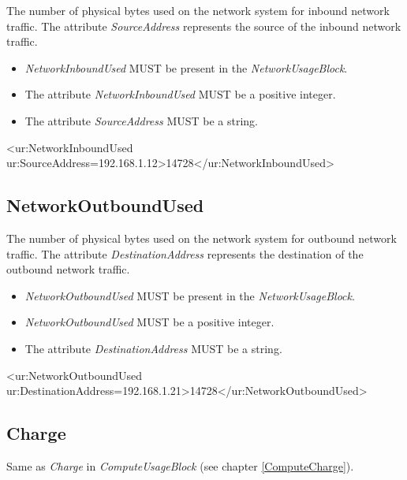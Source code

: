 The number of physical bytes used on the network system for inbound network traffic. The attribute \emph{SourceAddress} represents the source of the inbound network traffic.

\begin{itemize}
\item \emph{NetworkInboundUsed} MUST be present in the \emph{NetworkUsageBlock}.
\item The attribute \emph{NetworkInboundUsed} MUST be a positive integer.
\item The attribute \emph{SourceAddress} MUST be a string.
\end{itemize}

\begin{XMLexample}
<ur:NetworkInboundUsed ur:SourceAddress=192.168.1.12>14728</ur:NetworkInboundUsed> 
\end{XMLexample}






\subsection{NetworkOutboundUsed}

The number of physical bytes used on the network system for outbound network traffic. The attribute \emph{DestinationAddress} represents the destination of the outbound network traffic.

\begin{itemize}
\item \emph{NetworkOutboundUsed} MUST be present in the \emph{NetworkUsageBlock}.
\item \emph{NetworkOutboundUsed} MUST be a positive integer.
\item The attribute \emph{DestinationAddress} MUST be a string.
\end{itemize}

\begin{XMLexample}
<ur:NetworkOutboundUsed ur:DestinationAddress=192.168.1.21>14728</ur:NetworkOutboundUsed> 
\end{XMLexample}






\subsection{Charge}

Same as \emph{Charge} in \emph{ComputeUsageBlock} (see chapter \ref{ComputeCharge}).
